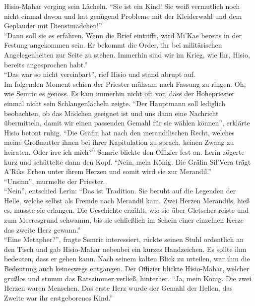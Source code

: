 Hisio-Mahar verging sein Lächeln. ``Sie ist ein Kind! Sie weiß vermutlich noch nicht einmal davon 
und hat genügend Probleme mit der Kleiderwahl und dem Geplauder mit Dienstmädchen!''\\
``Dann soll sie es erfahren. Wenn die Brief eintrifft, wird Mi'Kae bereits in der Festung 
angekommen sein. Er bekommt die Order, ihr bei militärischen Angelegenheiten zur Seite zu stehen. 
Immerhin sind wir im Krieg, wie Ihr, Hisio, bereits angesprochen habt.''\\
``Das war so nicht vereinbart'', rief Hisio und stand abrupt auf.\\
Im folgenden Moment schien der Priester mühsam nach Fassung zu ringen. Oh, wie Semric es genoss. Es 
kam immerhin nicht oft vor, dass der Hohepriester einmal nicht sein Schlangenlächeln zeigte.
``Der Hauptmann soll lediglich beobachten, ob das Mädchen geeignet ist und uns dann eine Nachricht 
übermitteln, damit wir einen passenden Gemahl für sie wählen können'', erklärte Hisio betont ruhig.
``Die Gräfin hat nach den merandilischen Recht, welches meine Großmutter ihnen bei ihrer 
Kapitulation zu sprach, keinen Zwang zu heiraten. Oder irre ich mich?'' Semric blickte den Offizier 
fest an.
Lerin zögerte kurz und schüttelte dann den Kopf. ``Nein, mein König. Die Gräfin Sil'Vera trägt 
A'Riks Erben unter ihrem Herzen und somit wird sie zur Merandil.''\\
``Unsinn'', murmelte der Priester.\\
``Nein'', entschied Lerin: ``Das ist Tradition. Sie beruht auf die Legenden der Helle, welche 
selbst als Fremde nach Merandil kam. Zwei Herzen Merandils, hieß es, musste sie erlangen. Die 
Geschichte erzählt, wie sie über Gletscher reiste und zum Meeresgrund schwamm, bis sie schließlich 
im Schein einer einzelnen Kerze das zweite Herz gewann.''\\
``Eine Metapher?'', fragte Semric interessiert, rückte seinen Stuhl ordentlich an den Tisch und gab 
Hisio-Mahar nebenbei ein kurzes Handzeichen. Es sollte ihm bedeuten, dass er gehen kann. Nach 
seinem kalten Blick zu urteilen, war ihm die Bedeutung auch keineswegs entgangen. Der Offizier 
blickte Hisio-Mahar, welcher grußlos und stumm das Ratszimmer verließ, hinterher. ``Ja, mein König. 
Die zwei Herzen waren Menschen. Das erste Herz wurde der Gemahl der Hellen, das Zweite war ihr 
erstgeborenes Kind.''\\


